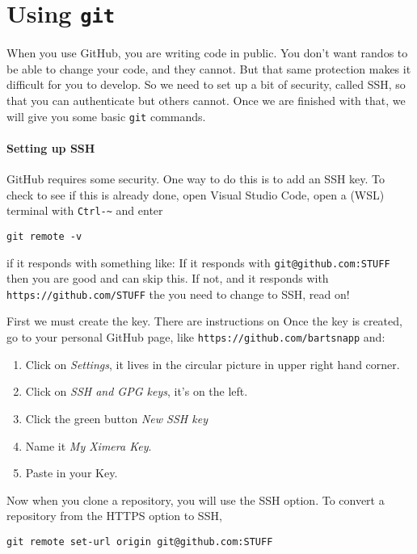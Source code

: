 \documentclass{ximera}
\begin{document}
\section{Using \texttt{git}}

When you use GitHub, you are writing code in public. You don't want randos to
be able to change your code, and they cannot.  But that same protection makes
it difficult for you to develop. So we need to set up a bit of security, called
SSH, so that you can authenticate but others cannot.
Once we are finished with that, we will give you some basic \texttt{git} commands. 


\paragraph{Setting up SSH} GitHub requires some security. One way to do this is
to add an SSH key. To check to see if this is already done, open Visual Studio
Code, open a (WSL) terminal with \verb!Ctrl-~! and enter
\begin{verbatim}
git remote -v
\end{verbatim}
if it responds with something like: If it responds with \verb!git@github.com:STUFF! then you
are good and can skip this. If not, and it responds with  \verb!https://github.com/STUFF! the you
need to change to SSH, read on!

First we must create the key. There are instructions on 
Once the key is created, go to your personal GitHub page, like
\verb!https://github.com/bartsnapp! and:
\begin{enumerate}
    \item  Click on \textit{Settings}, it lives in the circular picture in
          upper right hand corner.
    \item Click on \textit{SSH and GPG keys}, it's on the left.
    \item Click the green button \textit{New SSH key}
    \item Name it \textit{My Ximera Key}.
    \item Paste in your Key.
\end{enumerate}
Now when you clone a repository, you will use the SSH option.  To convert a
repository from the HTTPS option to SSH,
\begin{verbatim}
git remote set-url origin git@github.com:STUFF
\end{verbatim}
\end{document}
